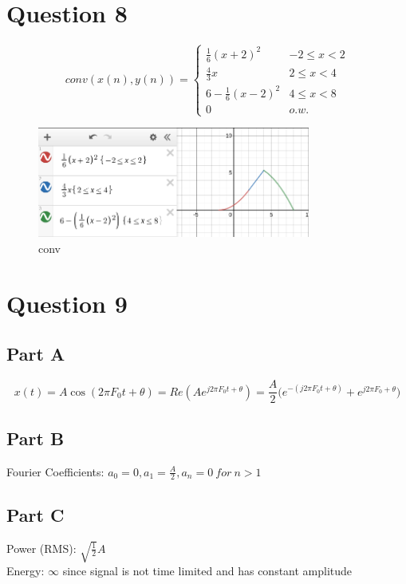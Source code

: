 \documentclass[12pt, letter]{article}
\begin{document}
\section{Question 8}%
\label{sec:question_8}
\[
	conv(x(n), y(n)) = \begin{cases}
	\frac{1}{6}(x+2)^2 & -2 \le x < 2 \\
	\frac{4}{3}x      & 2 \le x < 4 \\
	6 - \frac{1}{6}(x-2)^2 & 4 \le x < 8 \\
	0	& o.w.
	\end{cases}
\]

\begin{figure}[h]
	\centering
	\includegraphics[width=0.8\textwidth]{conv}
	\caption{conv}
	\label{fig:conv}
\end{figure}



\section{Question 9}%
\label{sec:question_9}
\subsection*{Part A}
\[
x(t) = A\cos(2\pi F_0t+\theta) = Re(Ae^{j 2\pi F_0t+\theta}) = \frac{A}{2}\big(e^{-(j 2\pi F_0t+\theta)}+e^{j 2\pi F_0+\theta}\big)
\]
\subsection*{Part B}
Fourier Coefficients: $a_0 = 0, a_1 =  \frac{A}{2}, a_n = 0 \ for \  n > 1$

\subsection*{Part C}
Power (RMS): $\sqrt{\frac{1}{2}}A $ \\
Energy: $\infty$ since signal is not time limited and has constant amplitude
\end{document}
